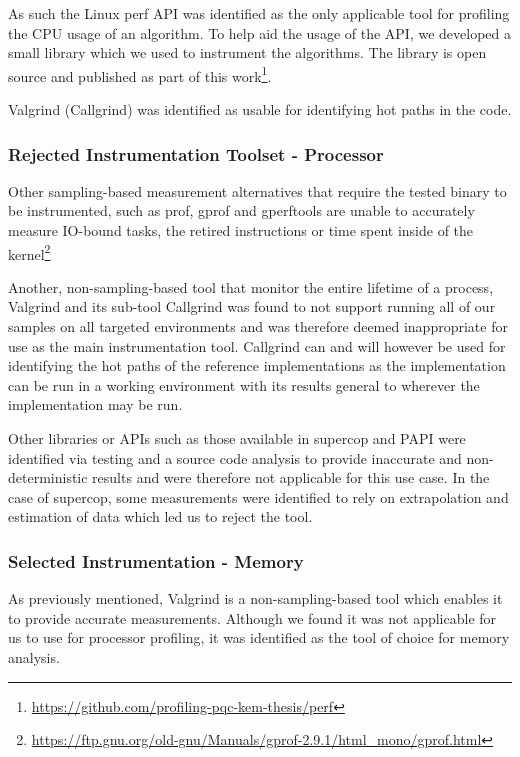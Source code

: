 As such the Linux perf API was identified as the only applicable tool for profiling the CPU usage of an algorithm. To help aid the usage of the API, we developed a small library which we used to instrument the algorithms. The library is open source and published as part of this work\footnote{\href{https://github.com/profiling-pqc-kem-thesis/perf}{https://github.com/profiling-pqc-kem-thesis/perf}}.

Valgrind (Callgrind) was identified as usable for identifying hot paths in the code.

\subsubsection{Rejected Instrumentation Toolset - Processor}
\label{section:method:experiment:phase1:rejected-toolset-processor}
Other sampling-based measurement alternatives that require the tested binary to be instrumented, such as prof, gprof and gperftools are unable to accurately measure IO-bound tasks, the retired instructions or time spent inside of the kernel\footnote{\href{https://ftp.gnu.org/old-gnu/Manuals/gprof-2.9.1/html\_mono/gprof.html}{https://ftp.gnu.org/old-gnu/Manuals/gprof-2.9.1/html\_mono/gprof.html}}

Another, non-sampling-based tool that monitor the entire lifetime of a process, Valgrind and its sub-tool Callgrind was found to not support running all of our samples on all targeted environments and was therefore deemed inappropriate for use as the main instrumentation tool. Callgrind can and will however be used for identifying the hot paths of the reference implementations as the implementation can be run in a working environment with its results general to wherever the implementation may be run.

Other libraries or APIs such as those available in \gls{supercop} and PAPI were identified via testing and a source code analysis to provide inaccurate and non-deterministic results and were therefore not applicable for this use case. In the case of \gls{supercop}, some measurements were identified to rely on extrapolation and estimation of data which led us to reject the tool.

\subsubsection{Selected Instrumentation - Memory}
\label{section:method:experiment:phase1:selected-toolset-memory}
As previously mentioned, Valgrind is a non-sampling-based tool which enables it to provide accurate measurements. Although we found it was not applicable for us to use for processor profiling, it was identified as the tool of choice for memory analysis.


